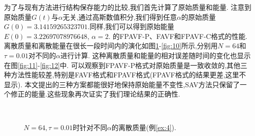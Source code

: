 为了与现有方法进行结构保存能力的比较,我们首先计算了原始质量和能量.
注意到原始质量$G(t)$与$\alpha$无关,通过高斯数值积分,我们得到任意$\alpha$的原始质量$G(0)=3.14159265323701$.同样,我们可以得到原始能量$E(0)=3.22697078976648$, $\alpha=2$.
的FPAVF-P、FAVF和FPAVF-C格式的性能.离散质量和离散能量在很长一段时间内的演化如图\ref{fig:9}-\ref{fig:10}所示,分别用$N=64$和$\tau=0.01$对不同的$\alpha$进行计算.
这种离散质量和能量的相对误差随时间的变化也显示在图\ref{fig:11}-\ref{fig:12}中.
可以观察到FPAVF-P格式对原始质量是一致收敛的,其他三种方法性能较差,特别是FAVF格式和FPAVF格式(FPAVF格式的结果更差,这里不显示).
本文提出的三种方案都能很好地保持原始能量不变性,SAV方法只保留了一个修正的能量.这些现象再次证实了我们理论结果的正确性.

\begin{figure}[H]
	\begin{center}
	 \\
	 \caption{$N = 64,\tau=0.01$时针对不同$\alpha$的离散质量(例\ref{ex:4}).} \label{fig:9}
	\end{center}
	\end{figure}

